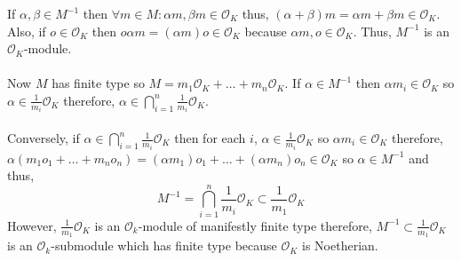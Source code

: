 \documentclass[12pt]{extarticle}
\newcommand{\ints}[1]{\mathcal{O}_{#1}}
\begin{document}
\begin{enumerate}
\begin{enumerate}
If $\alpha, \beta \in M^{-1}$ then $\forall m \in M : \alpha m, \beta m \in \ints{K}$ thus, $(\alpha + \beta)m = \alpha m + \beta m \in \ints{K}$. Also, if $o \in \ints{K}$ then $o \alpha m = (\alpha m) o \in \ints{K}$ because $\alpha m, o \in \ints{K}$. Thus, $M^{-1}$ is an $\ints{K}$-module. \\ \\
Now $M$ has finite type so $M = m_1 \ints{K} + \dots + m_n \ints{K}$. If $\alpha \in M^{-1}$ then $\alpha m_i \in \ints{K}$ so $\alpha \in \frac{1}{m_i} \ints{K}$ therefore, $\alpha \in \bigcap\limits_{i = 1}^n \frac{1}{m_i} \ints{K}$. \\ \\ Conversely, if $\alpha \in \bigcap\limits_{i = 1}^n \frac{1}{m_i} \ints{K}$ then for each $i$, $\alpha \in \frac{1}{m_i} \ints{K}$ so $\alpha m_i \in \ints{K}$ therefore, $\alpha (m_1 o_1 + \dots + m_n o_n) = (\alpha m_1)o_1 + \dots + (\alpha m_n) o_n \in \ints{K}$ so $\alpha \in M^{-1}$ and thus, \[M^{-1} = \bigcap\limits_{i = 1}^n \frac{1}{m_i} \ints{K} \subset \frac{1}{m_1} \ints{K}\] However, $\frac{1}{m_1} \ints{K}$ is an $\ints{k}$-module of manifestly finite type therefore, $M^{-1} \subset \frac{1}{m_1} \ints{K}$ is an $\ints{k}$-submodule which has finite type because $\ints{K}$ is Noetherian. 


\end{enumerate}
\end{enumerate}
\end{document}
